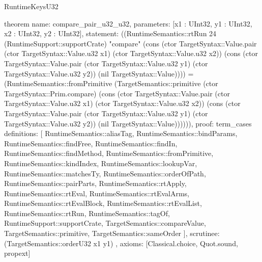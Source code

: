 \begin{lexlean}{RuntimeKeysU32}
\begin{semanticmodule}
theorem{
  name: compare_pair_u32_u32,
  parameters: [x1 : UInt32, y1 : UInt32, x2 : UInt32, y2 : UInt32],
  statement: ((RuntimeSemantics::rtRun 24 (RuntimeSupport::supportCrate) "compare" (cons (ctor TargetSyntax::Value.pair (ctor TargetSyntax::Value.u32 x1) (ctor TargetSyntax::Value.u32 x2)) (cons (ctor TargetSyntax::Value.pair (ctor TargetSyntax::Value.u32 y1) (ctor TargetSyntax::Value.u32 y2)) (nil TargetSyntax::Value)))) = (RuntimeSemantics::fromPrimitive (TargetSemantics::primitive (ctor TargetSyntax::Prim.compare) (cons (ctor TargetSyntax::Value.pair (ctor TargetSyntax::Value.u32 x1) (ctor TargetSyntax::Value.u32 x2)) (cons (ctor TargetSyntax::Value.pair (ctor TargetSyntax::Value.u32 y1) (ctor TargetSyntax::Value.u32 y2)) (nil TargetSyntax::Value)))))),
  proof: term_cases{
    definitions: [
      RuntimeSemantics::aliasTag,
      RuntimeSemantics::bindParams,
      RuntimeSemantics::findFree,
      RuntimeSemantics::findIn,
      RuntimeSemantics::findMethod,
      RuntimeSemantics::fromPrimitive,
      RuntimeSemantics::kindIndex,
      RuntimeSemantics::lookupVar,
      RuntimeSemantics::matchesTy,
      RuntimeSemantics::orderOfPath,
      RuntimeSemantics::pairParts,
      RuntimeSemantics::rtApply,
      RuntimeSemantics::rtEval,
      RuntimeSemantics::rtEvalArms,
      RuntimeSemantics::rtEvalBlock,
      RuntimeSemantics::rtEvalList,
      RuntimeSemantics::rtRun,
      RuntimeSemantics::tagOf,
      RuntimeSupport::supportCrate,
      TargetSemantics::compareValue,
      TargetSemantics::primitive,
      TargetSemantics::sameOrder
    ],
    scrutinee: (TargetSemantics::orderU32 x1 y1)
  },
  axioms: [Classical.choice, Quot.sound, propext]
}


\end{semanticmodule}
\end{lexlean}

